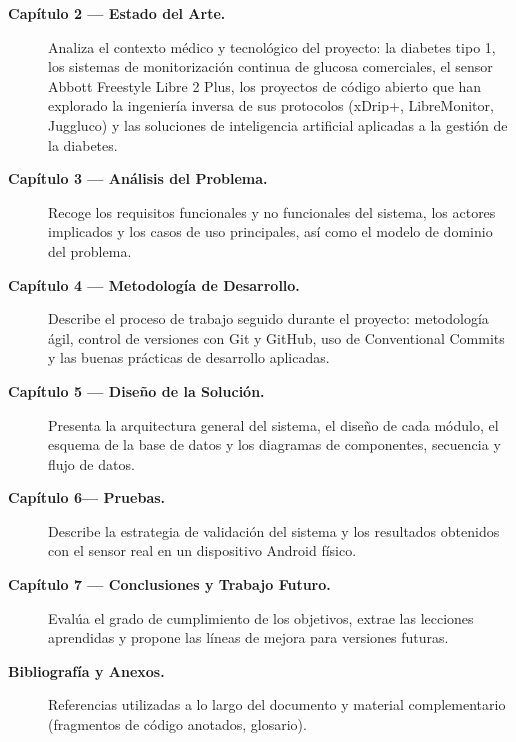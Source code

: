 \begin{description}
    \item[\textbf{Capítulo 2 — Estado del Arte.}] Analiza el contexto médico y tecnológico
    del proyecto: la diabetes tipo 1, los sistemas de monitorización continua de glucosa
    comerciales, el sensor Abbott Freestyle Libre 2 Plus, los proyectos de código abierto
    que han explorado la ingeniería inversa de sus protocolos (xDrip+, LibreMonitor,
    Juggluco) y las soluciones de inteligencia artificial aplicadas a la gestión de la
    diabetes.

    \item[\textbf{Capítulo 3 — Análisis del Problema.}] Recoge los requisitos funcionales
    y no funcionales del sistema, los actores implicados y los casos de uso principales,
    así como el modelo de dominio del problema.

    \item[\textbf{Capítulo 4 — Metodología de Desarrollo.}] Describe el proceso de trabajo
    seguido durante el proyecto: metodología ágil, control de versiones con Git y GitHub,
    uso de Conventional Commits y las buenas prácticas de desarrollo aplicadas.

    \item[\textbf{Capítulo 5 — Diseño de la Solución.}] Presenta la arquitectura general
    del sistema, el diseño de cada módulo, el esquema de la base de datos y los diagramas
    de componentes, secuencia y flujo de datos.


    \item[\textbf{Capítulo 6— Pruebas.}] Describe la estrategia de validación del sistema
    y los resultados obtenidos con el sensor real en un dispositivo Android físico.

    \item[\textbf{Capítulo 7 — Conclusiones y Trabajo Futuro.}] Evalúa el grado de
    cumplimiento de los objetivos, extrae las lecciones aprendidas y propone las líneas
    de mejora para versiones futuras.

    \item[\textbf{Bibliografía y Anexos.}] Referencias utilizadas a lo largo del documento
    y material complementario (fragmentos de código anotados, glosario).
\end{description}
